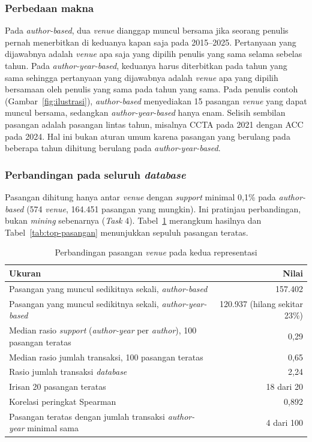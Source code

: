 \subsubsection{Perbedaan makna}
Pada \textit{author-based}, dua \textit{venue} dianggap muncul bersama jika seorang penulis pernah menerbitkan di keduanya kapan saja pada 2015--2025. Pertanyaan yang dijawabnya adalah \textit{venue} apa saja yang dipilih penulis yang sama selama sebelas tahun. Pada \textit{author-year-based}, keduanya harus diterbitkan pada tahun yang sama sehingga pertanyaan yang dijawabnya adalah \textit{venue} apa yang dipilih bersamaan oleh penulis yang sama pada tahun yang sama. Pada penulis contoh (Gambar~\ref{fig:ilustrasi}), \textit{author-based} menyediakan 15 pasangan \textit{venue} yang dapat muncul bersama, sedangkan \textit{author-year-based} hanya enam. Selisih sembilan pasangan adalah pasangan lintas tahun, misalnya CCTA pada 2021 dengan ACC pada 2024. Hal ini bukan aturan umum karena pasangan yang berulang pada beberapa tahun dihitung berulang pada \textit{author-year-based}.

\subsubsection{Perbandingan pada seluruh \textit{database}}
Pasangan dihitung hanya antar \textit{venue} dengan \textit{support} minimal 0,1\% pada \textit{author-based} (574 \textit{venue}, 164.451 pasangan yang mungkin). Ini pratinjau perbandingan, bukan \textit{mining} sebenarnya (\textit{Task} 4). Tabel~\ref{tab:banding-repr} merangkum hasilnya dan Tabel~\ref{tab:top-pasangan} menunjukkan sepuluh pasangan teratas.

\begin{table}[ht]
\caption{Perbandingan pasangan \textit{venue} pada kedua representasi}
\label{tab:banding-repr}
\small
\begin{tabular}{@{}lr@{}}
\toprule
\textbf{Ukuran} & \textbf{Nilai} \\
\midrule
Pasangan yang muncul sedikitnya sekali, \textit{author-based} & 157.402 \\
Pasangan yang muncul sedikitnya sekali, \textit{author-year-based} & 120.937 (hilang sekitar 23\%) \\
Median rasio \textit{support} (\textit{author-year} per \textit{author}), 100 pasangan teratas & 0,29 \\
Median rasio jumlah transaksi, 100 pasangan teratas & 0,65 \\
Rasio jumlah transaksi \textit{database} & 2,24 \\
Irisan 20 pasangan teratas & 18 dari 20 \\
Korelasi peringkat Spearman & 0,892 \\
Pasangan teratas dengan jumlah transaksi \textit{author-year} minimal sama & 4 dari 100 \\
\bottomrule
\end{tabular}
\end{table}

